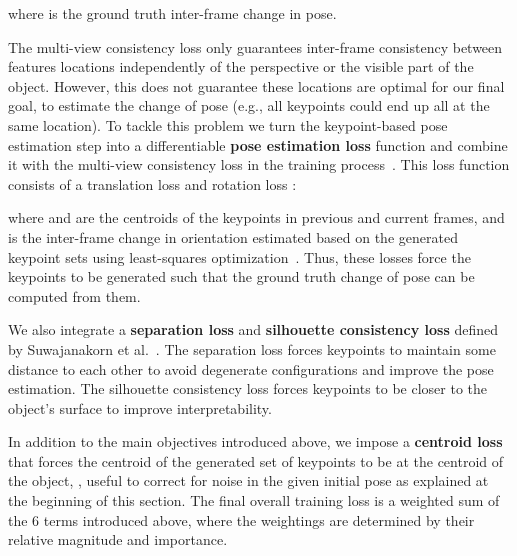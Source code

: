 \documentclass[letterpaper, 10 pt, conference]{ieeeconf}
\begin{document}
where  is the ground truth inter-frame change in pose. 

The multi-view consistency loss only guarantees inter-frame consistency between features locations independently of the perspective or the visible part of the object. However, this does not guarantee these locations are optimal for our final goal, to estimate the change of pose (e.g., all keypoints could end up all at the same location). To tackle this problem we turn the keypoint-based pose estimation step into a differentiable \textbf{pose estimation loss} function and combine it with the multi-view consistency loss in the training process~\cite{suwajanakorn2018discovery}. This loss function consists of a translation loss  and rotation loss :




where  and  are the centroids of the keypoints in previous and current frames, and  is the inter-frame change in orientation estimated based on the generated keypoint sets using least-squares optimization~\cite{arun1987least}. Thus, these losses force the keypoints to be generated such that the ground truth change of pose can be computed from them. 

We also integrate a \textbf{separation loss}  and \textbf{silhouette consistency loss}  defined by Suwajanakorn et al.~\cite{suwajanakorn2018discovery}. The separation loss forces keypoints to maintain some distance to each other to avoid degenerate configurations and improve the pose estimation. The silhouette consistency loss forces keypoints to be closer to the object's surface to improve interpretability.

In addition to the main objectives introduced above, we impose a \textbf{centroid loss} that forces the centroid of the generated set of keypoints to be at the centroid of the object, , useful to correct for noise in the given initial pose as explained at the beginning of this section. The final overall training loss is a weighted sum of the 6 terms introduced above, where the weightings are determined by their relative magnitude and importance.
\end{document}
